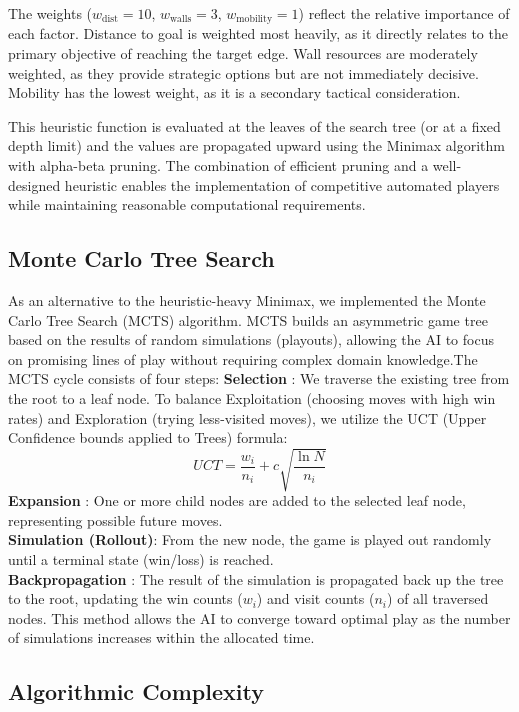 \documentclass[a4paper]{article}
\begin{document}
The weights ($w_{\mathrm{dist}} = 10$, $w_{\mathrm{walls}} = 3$, $w_{\mathrm{mobility}} = 1$)
reflect the relative importance of each factor. Distance to goal is weighted
most heavily, as it directly relates to the primary objective of reaching the
target edge. Wall resources are moderately weighted, as they provide strategic
options but are not immediately decisive. Mobility has the lowest weight, as it
is a secondary tactical consideration.

This heuristic function is evaluated at the leaves of the search tree (or at a
fixed depth limit) and the values are propagated upward using the Minimax
algorithm with alpha-beta pruning. The combination of efficient pruning and a
well-designed heuristic enables the implementation of competitive automated
players while maintaining reasonable computational requirements.

\subsection{Monte Carlo Tree Search}

As an alternative to the heuristic-heavy Minimax, we implemented the Monte Carlo 
Tree Search (MCTS) algorithm. MCTS builds an asymmetric game tree based on the results of 
random simulations (playouts), allowing the AI to focus on promising lines of play without 
requiring complex domain knowledge.The MCTS cycle consists of four steps:
\textbf{Selection} : We traverse the existing tree from the root to a leaf node. 
To balance Exploitation (choosing moves with high win rates) and Exploration (trying less-visited moves), 
we utilize the UCT (Upper Confidence bounds applied to Trees) formula:
$$UCT = \frac{w_i}{n_i} + c \sqrt{\frac{\ln N}{n_i}}$$
\textbf{Expansion} : One or more child nodes are added to the selected leaf node, 
representing possible future moves. \\
\textbf{Simulation (Rollout)}: From the new node, the game is played out randomly until 
a terminal state (win/loss) is reached. \\
\textbf{Backpropagation} : The result of the simulation is propagated back up the tree to 
the root, updating the win counts ($w_i$) and visit counts ($n_i$) of all traversed nodes. 
\newline This method allows the AI to converge toward optimal play as the number of simulations 
increases within the allocated time.

\subsection{Algorithmic Complexity}
\end{document}
